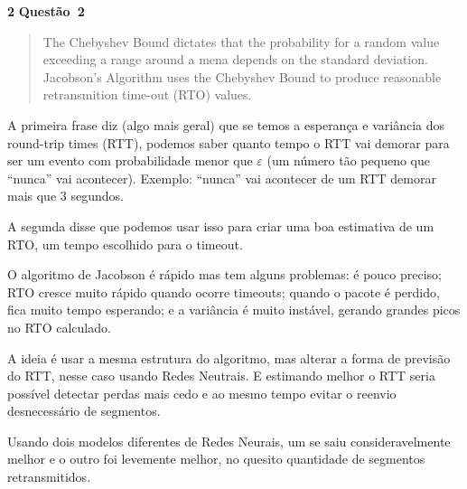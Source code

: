 \documentclass{article}
\newcounter{exe-list}
\newenvironment{exe-list}
    {\begin{list}{\alph{exe-list}.}{\usecounter{exe-list}}}
    {\end{list}}
\newenvironment{exe}[2][Problema]
    {\newcommand{\opt}{(Opcional)}%
    \newcommand{\sketch}[1]{{\bfseries Rascunho:} ##1}%
    \medskip\par\noindent\ifthenelse{\equal{#1}{}}
        {\textbf{\large #2}}
        {\textbf{\large #1~#2}}%
    \medskip\par\noindent}
    {\medskip}
\begin{document}
\begin{exe}[Questão]{2}
    \begin{exe-list}
    \item
        \begin{quote}
            The Chebyshev Bound dictates that
            the probability for a random value
            exceeding a range around a mena
            depends on the standard deviation.
            Jacobson's Algorithm uses the Chebyshev Bound
            to produce reasonable retransmition time-out (RTO) values.
        \end{quote}
        A primeira frase diz (algo mais geral) que
        se temos a esperança e variância
        dos round-trip times (RTT),
        podemos saber quanto tempo o RTT vai demorar
        para ser um evento com probabilidade menor que \(\varepsilon\)
        (um número tão pequeno que ``nunca'' vai acontecer).
        Exemplo: ``nunca'' vai acontecer de um RTT
        demorar mais que \(3\) segundos.

        A segunda disse que podemos usar isso
        para criar uma boa estimativa de um RTO,
        um tempo escolhido para o timeout.
    \item
        O algoritmo de Jacobson é rápido mas tem alguns problemas:
        é pouco preciso;
        RTO cresce muito rápido quando ocorre timeouts;
        quando o pacote é perdido, fica muito tempo esperando;
        e a variância é muito instável,
        gerando grandes picos no RTO calculado.

        A ideia é usar a mesma estrutura do algoritmo,
        mas alterar a forma de previsão do RTT,
        nesse caso usando Redes Neutrais.
        E estimando melhor o RTT seria possível
        detectar perdas mais cedo e
        ao mesmo tempo
        evitar o reenvio desnecessário de segmentos.

        Usando dois modelos diferentes de Redes Neurais,
        um se saiu consideravelmente melhor e
        o outro foi levemente melhor,
        no quesito quantidade de segmentos retransmitidos.
    \end{exe-list}
\end{exe}
\end{document}
